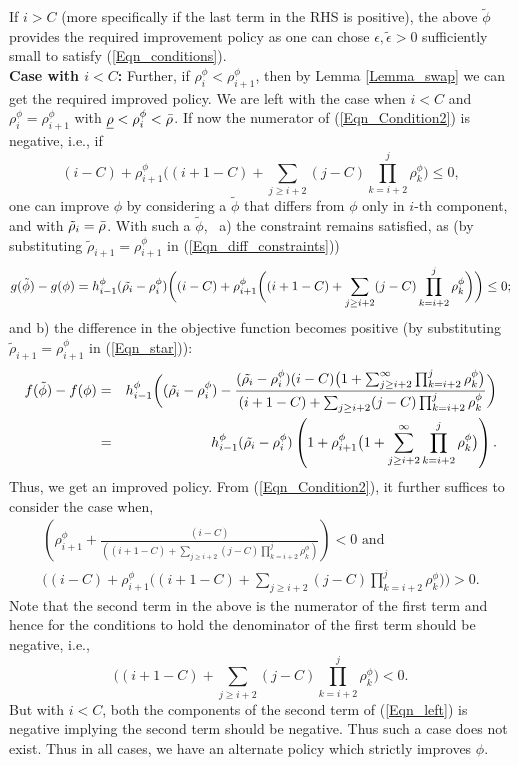 If $i > C$ (more specifically if the last term in the RHS is positive), the above ${\tilde \phi}$ provides the required improvement policy as one can chose $\epsilon, {\tilde{\epsilon}} > 0$
sufficiently small to satisfy (\ref{Eqn_conditions}). \\
%
{\bf Case with  $i < C$:}  Further, if $\rho^\phi_i < \rho^\phi_{i+1}$, then by Lemma \ref{Lemma_swap} we can get the required improved policy.
%
We are left with the case when $i < C$ and    $\rho^\phi_i = \rho^\phi_{i+1}$  with ${\underline \rho} < \rho^\phi_i < {\bar \rho}$.   
If now   the numerator of (\ref{Eqn_Condition2}) is negative, i.e., if
$$
(i - C) +    \rho^\phi_{i+1}  \bigg( (i+1-C) + \sum_{j \geq i+2} (j - C) \prod_{k = i+2}^{j} \rho^\phi_k    \bigg) \le  0,
$$
one can improve $\phi$ by considering a ${\tilde \phi}$ that differs from $\phi$ only in $i$-th component,  and with  ${\tilde \rho}_i = {\bar \rho}$.  With such a ${\tilde \phi}$, \     a) the constraint remains satisfied, as  (by substituting ${\tilde \rho}_{i+1} = \rho^\phi_{i+1}$ in (\ref{Eqn_diff_constraints}))
\begin{eqnarray}
\label{Eqn_diff_constraints2}
g(\tilde{\phi}) - g(\phi)   
= h_{i-1}^\phi (\tilde{\rho_i} - \rho^\phi_i)  \bigg( (i - C) +     \rho^\phi_{i+1} \bigg( (i+1-C) + \sum_{j \geq i+2} (j - C) \prod_{k = i+2}^{j} \rho^\phi_k    \bigg) \bigg)  \le  0 ;
\end{eqnarray} and 
b) the difference in the objective function becomes positive (by substituting ${\tilde \rho}_{i+1} = \rho^\phi_{i+1}$ in (\ref{Eqn_star})):
\begin{eqnarray*}
	f(\tilde{\phi}) - f(\phi)   
	&=& h_{i - 1}^\phi \bigg( (\tilde{\rho_i} - \rho^\phi_i) - \frac{(\tilde{\rho_i} - \rho^\phi_i)(i - C)\big(1 + \sum_{j \geq i+2}^{\infty} \prod_{k = i+2}^j  \rho^\phi_k \big)}{(i+1-C) + \sum_{j \geq i+2} (j - C) \prod_{k = i+2}^{j} \rho^\phi_k}  \bigg) \\
	&=& h_{i - 1}^\phi   (\tilde{\rho_i} - \rho^\phi_i)   \left (1 + \rho^\phi_{i+1} \big(1 + \sum_{j \geq i+2}^{\infty} \prod_{k = i+2}^j  \rho^\phi_k \big) \right ).
\end{eqnarray*}  Thus, we get an improved policy.
From (\ref{Eqn_Condition2}),  it further suffices to consider the case when,
\begin{eqnarray}
\label{Eqn_left}
\left ( \rho^\phi_{i+1 } + \frac{ (i - C)}{  \left((i+1-C) + \sum_{j \geq i+2} (j - C) \prod_{k = i+2}^{j} \rho^\phi_k \right)} \right )  < 0 
\mbox{ and }  \\ 
 \bigg( (i - C) +     \rho^\phi_{i+1} \bigg( (i+1-C) + \sum_{j \geq i+2} (j - C) \prod_{k = i+2}^{j} \rho^\phi_k    \bigg) \bigg) > 0. 
\end{eqnarray}
Note that the second term in the above is the numerator of the first term and hence for the conditions to hold the denominator of the first term should be negative, i.e., 
$$
\bigg( (i+1-C) + \sum_{j \geq i+2} (j - C) \prod_{k = i+2}^{j} \rho^\phi_k    \bigg)   < 0.
$$
But with $i < C$, both the components of the second term of  (\ref{Eqn_left}) is negative implying the second term should be negative. Thus such a case does not exist.  
%
Thus in all cases, we have   an alternate   policy which strictly improves $\phi$. 
%
